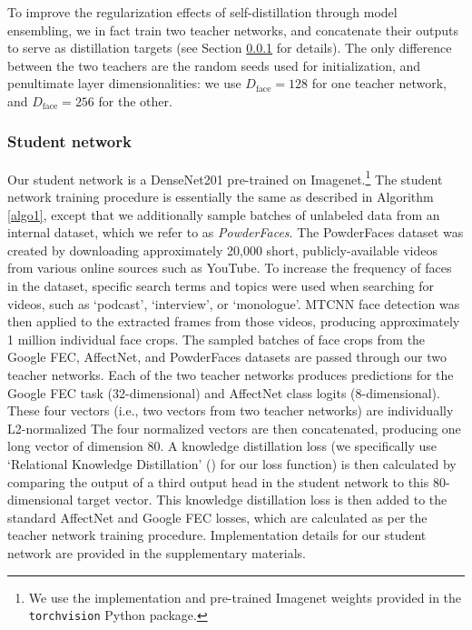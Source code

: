 \documentclass[times,twocolumn,final,authoryear]{elsarticle}
\begin{document}
	To improve the regularization effects of self-distillation through model ensembling, we in fact train two teacher networks, and concatenate their outputs to serve as distillation targets (see Section \ref{sec:student} for details). The only difference between the two teachers are the random seeds used for initialization, and penultimate layer dimensionalities: we use $D_{\text{face}}=128$ for one teacher network, and $D_{\text{face}}=256$ for the other.
	
	\subsubsection{Student network}
	\label{sec:student}
	
	Our student network is a DenseNet201 pre-trained on Imagenet.\footnote{We use the implementation and pre-trained Imagenet weights provided in the \texttt{torchvision} Python package.} The student network training procedure is essentially the same as described in Algorithm \ref{algo1}, except that we additionally sample batches of unlabeled data from an internal dataset, which we refer to as \textit{PowderFaces}. The PowderFaces dataset was created by downloading approximately 20,000 short, publicly-available videos from various online sources such as YouTube. To increase the frequency of faces in the dataset, specific search terms and topics were used when searching for videos, such as `podcast', `interview', or `monologue'. MTCNN face detection was then applied to the extracted frames from those videos, producing approximately 1 million individual face crops. The sampled batches of face crops from the Google FEC, AffectNet, and PowderFaces datasets are passed through our two teacher networks. Each of the two teacher networks produces predictions for the Google FEC task (32-dimensional) and AffectNet class logits (8-dimensional). These four vectors (i.e., two vectors from two teacher networks) are individually L2-normalized The four normalized vectors are then concatenated, producing one long vector of dimension 80. A knowledge distillation loss (we specifically use `Relational Knowledge Distillation' (\cite{park2019relational}) for our loss function) is then calculated by comparing the output of a third output head in the student network to this 80-dimensional target vector. This knowledge distillation loss is then added to the standard AffectNet and Google FEC losses, which are calculated as per the teacher network training procedure. Implementation details for our student network are provided in the supplementary materials.
	
\end{document}
